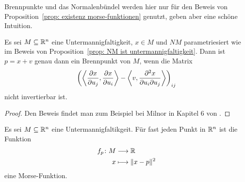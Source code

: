 Brennpunkte und das Normalenbündel werden hier nur für den Beweis von 
Proposition~\ref{prop: existenz morse-funktionen} genutzt, geben aber eine schöne Intuition.

\begin{lemma}
    \label{lemma: char. von Brennpunkten}
    Es sei $M \subseteq { \mathbb R }^n$ eine Untermannigfaltigkeit, $x \in M$ und $NM$ parametriesiert wie im 
    Beweis von Proposition~\ref{prop: NM ist untermannigfaltigkeit}. Dann ist $p = x + v$ genau 
    dann ein Brennpunkt von $M$, wenn die Matrix 
    \[
        \left( \left\langle \pderive[x]{u_j}, \pderive[x]{u_i} \right\rangle - 
        \left\langle v , \pdderive[x]{u_i}{u_j} \right\rangle \right)_{ij}
    \]
    nicht invertierbar ist.
\end{lemma}

\begin{proof}
    Den Beweis findet man zum Beispiel bei Milnor in Kapitel 6 von \cite{milnor}.
\end{proof}

\begin{prop}
    \label{prop: existenz morse-funktionen}
    Es sei $M \subseteq { \mathbb R }^n$ eine Untermannigfaltikgeit. Für fast jeden Punkt in ${ \mathbb R }^n$ ist
    die Funktion
    \begin{align*}
        f_p \colon M & \longrightarrow { \mathbb R } \\
        x & \longmapsto \| x - p \|^2
    \end{align*}
    eine Morse-Funktion.
\end{prop}

